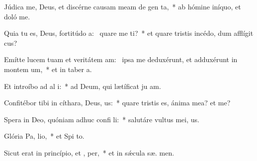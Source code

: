 \item Júdica me, Deus, et discérne causam meam de gen  ta,~* ab hómine iníquo, et doló  me.
\item Quia tu es, Deus, fortitúdo a:~\pscross{} quare me ti?~* et quare tristis incédo, dum afflígit  cus?
\item Emítte lucem tuam et veritátem am:~\pscross{} ipsa me deduxérunt, et adduxérunt in montem  um,~* et in taber a.
\item Et introíbo ad al i:~* ad Deum, qui lætíficat ju am.
\item Confitébor tibi in cíthara, Deus,  us:~* quare tristis es, ánima mea? et   me?
\item Spera in Deo, quóniam adhuc confi li:~* salutáre vultus mei,   us.
\item Glória Pa,  lio,~* et Spi to.
\item Sicut erat in princípio, et ,  per,~* et in sǽcula sæ. men.

